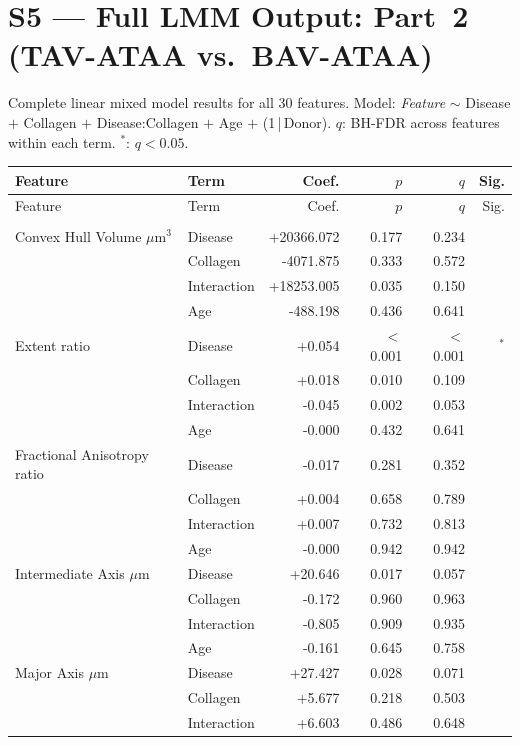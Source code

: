 \documentclass[11pt,a4paper]{article}
\begin{document}
\section*{S5 — Full LMM Output: Part~2 (TAV-ATAA vs.\ BAV-ATAA)}
Complete linear mixed model results for all 30 features.
Model: \textit{Feature} $\sim$ Disease $+$ Collagen $+$ Disease:Collagen $+$ Age $+$ (1\,|\,Donor).
$q$: BH-FDR across features within each term. $^{*}$: $q < 0.05$.
\vspace{1em}
\begin{longtable}{llrrrr}
\toprule
Feature & Term & Coef. & $p$ & $q$ & Sig. \\
\midrule\endfirsthead
\toprule Feature & Term & Coef. & $p$ & $q$ & Sig. \\\midrule\endhead
\bottomrule\endfoot
\multicolumn{6}{l}{\textit{Actin}} \\
  Convex Hull Volume $\mu$m$^{3}$ & Disease & +20366.072 & 0.177 & 0.234 &  \\
   & Collagen & -4071.875 & 0.333 & 0.572 &  \\
   & Interaction & +18253.005 & 0.035 & 0.150 &  \\
   & Age & -488.198 & 0.436 & 0.641 &  \\
  Extent ratio & Disease & +0.054 & $<$0.001 & $<$0.001 & $^{*}$ \\
   & Collagen & +0.018 & 0.010 & 0.109 &  \\
   & Interaction & -0.045 & 0.002 & 0.053 &  \\
   & Age & -0.000 & 0.432 & 0.641 &  \\
  Fractional Anisotropy ratio & Disease & -0.017 & 0.281 & 0.352 &  \\
   & Collagen & +0.004 & 0.658 & 0.789 &  \\
   & Interaction & +0.007 & 0.732 & 0.813 &  \\
   & Age & -0.000 & 0.942 & 0.942 &  \\
  Intermediate Axis $\mu$m & Disease & +20.646 & 0.017 & 0.057 &  \\
   & Collagen & -0.172 & 0.960 & 0.963 &  \\
   & Interaction & -0.805 & 0.909 & 0.935 &  \\
   & Age & -0.161 & 0.645 & 0.758 &  \\
  Major Axis $\mu$m & Disease & +27.427 & 0.028 & 0.071 &  \\
   & Collagen & +5.677 & 0.218 & 0.503 &  \\
   & Interaction & +6.603 & 0.486 & 0.648 &  \\

\end{longtable}
\end{document}
